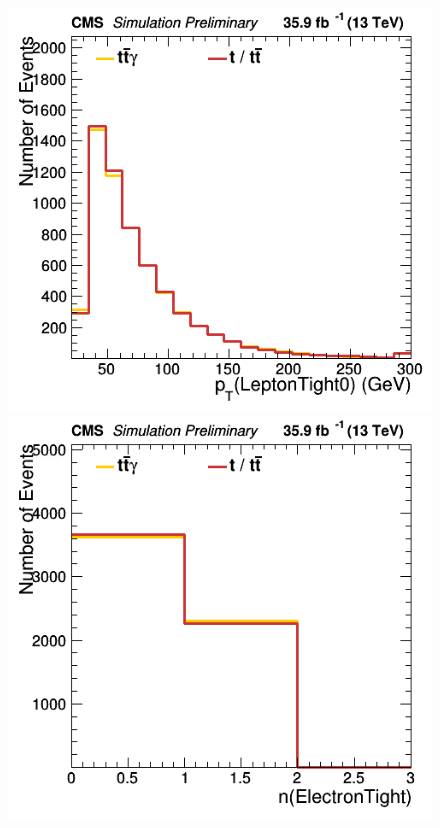 \documentclass[11pt]{scrartcl}
\begin{document}
	\begin{figure}[H]
	\centering
	\begin{minipage}{.5\textwidth}
	  \centering
	  \includegraphics[width=0.7\linewidth]{figures/Notused/LeptonTight0_pt.png}
	\end{minipage}%
	\begin{minipage}{.5\textwidth}
	  \centering
	  \includegraphics[width=0.7\linewidth]{figures/Notused/nElectronTight.png}
	\end{minipage}
	\end{figure}
	
\end{document}
